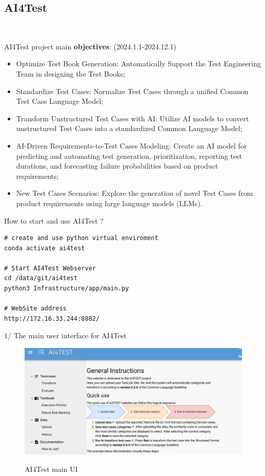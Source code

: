
\subsection{ AI4Test }\

AI4Test project main \textbf{objectives}: (2024.1.1-2024.12.1)

\begin{itemize}
    \item Optimize Test Book Generation: Automatically Support the Test Engineering Team in designing the Test Books;
    \item Standardize Test Cases: Normalize Test Cases through a unified Common Test Case Language Model;
    \item Transform Unstructured Test Cases with AI: Utilize AI models to convert unstructured Test Cases into a standardized Common Language Model;
    \item AI-Driven Requirements-to-Test Cases Modeling: Create an AI model for predicting and automating test generation, prioritization, reporting test durations, and forecasting failure probabilities based on product requirements;
    \item New Test Cases Scenarios: Explore the generation of novel Test Cases from product requirements using large language models (LLMs).
\end{itemize}

How to start and use AI4Test ?

\vspace{0.5cm}

\begin{lstlisting}
# create and use python virtual enviroment
conda activate ai4test

# Start AI4Test Webserver
cd /data/git/ai4test
python3 Infrastructure/app/main.py

# WebSite address
http://172.16.33.244:8882/
\end{lstlisting}

1/ The main user interface for AI4Test 

\begin{figure}[H]
    \begin{center}
        \includegraphics[width=.95\linewidth]{res/ai4test-main.png}\\
        \caption{AI4Test main UI}\label{ai4test-main}
    \end{center}
\end{figure}

